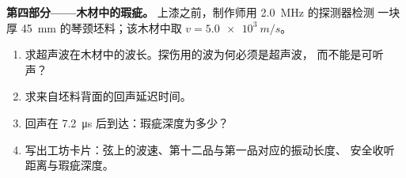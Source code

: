 \begin{problem}
\medskip
\noindent\textbf{第四部分——木材中的瑕疵。}
上漆之前，制作师用 \qty{2.0}{MHz} 的探测器检测
一块厚 \qty{45}{mm} 的琴颈坯料；该木材中取 $v = \qty{5.0e3}{m/s}$。
\begin{enumerate}[resume]
  \item 求超声波在木材中的波长。探伤用的波为何必须是超声波，
        而不能是可听声？
  \item 求来自坯料背面的回声延迟时间。
  \item 回声在 \qty{7.2}{\micro s} 后到达：瑕疵深度为多少？
  \item 写出工坊卡片：弦上的波速、第十二品与第一品对应的振动长度、
        安全收听距离与瑕疵深度。
\end{enumerate}
\end{problem}
